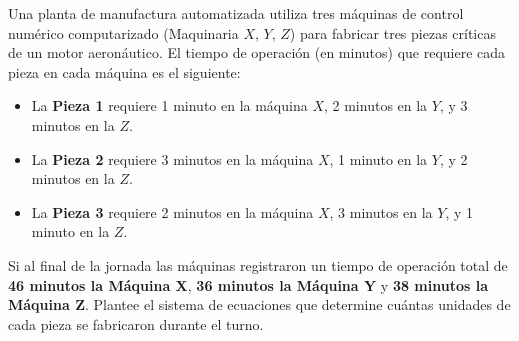 \documentclass[10pt,a4]{examenEPN0}
\begin{document}
\begin{preguntas}

\item Una planta de manufactura automatizada utiliza tres máquinas de control numérico computarizado (Maquinaria $X$, $Y$, $Z$) para fabricar tres piezas críticas de un motor aeronáutico. El tiempo de operación (en minutos) que requiere cada pieza en cada máquina es el siguiente:

\begin{itemize}
    \item La \textbf{Pieza 1} requiere 1 minuto en la máquina $X$, 2 minutos en la $Y$, y 3 minutos en la $Z$.
    \item La \textbf{Pieza 2} requiere 3 minutos en la máquina $X$, 1 minuto en la $Y$, y 2 minutos en la $Z$.
    \item La \textbf{Pieza 3} requiere 2 minutos en la máquina $X$, 3 minutos en la $Y$, y 1 minuto en la $Z$.
\end{itemize}

Si al final de la jornada las máquinas registraron un tiempo de operación total de \textbf{46 minutos la Máquina X}, \textbf{36 minutos la Máquina Y} y \textbf{38 minutos la Máquina Z}. Plantee el sistema de ecuaciones que determine cuántas unidades de cada pieza se fabricaron durante el turno. 



    
\par\vfill
\end{preguntas}
\final
\end{document}
